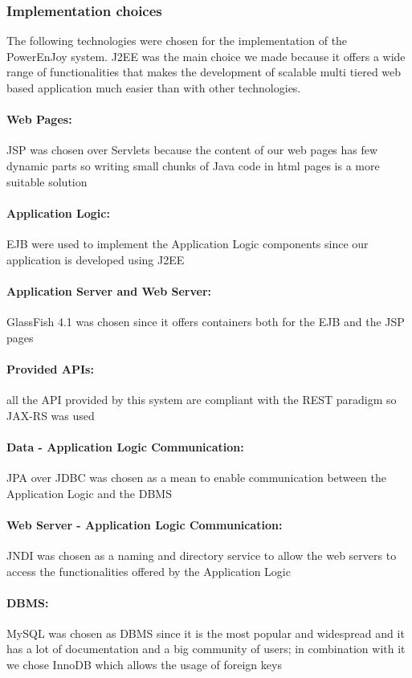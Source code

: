 \subsubsection{Implementation choices}
The following technologies were chosen for the implementation of the PowerEnJoy system. J2EE was the main choice we made because it offers a wide range of functionalities that makes the development of scalable multi tiered web based application much easier than with other technologies.

\paragraph{Web Pages:} JSP was chosen over Servlets because the content of our web pages has few dynamic parts so writing small chunks of Java code in html pages is a more suitable solution
\paragraph{Application Logic:} EJB were used to implement the Application Logic components since our application is developed using J2EE
\paragraph{Application Server and Web Server:} GlassFish 4.1 was chosen since it offers containers both for the EJB and the JSP pages 
\paragraph{Provided APIs:} all the API provided by this system are compliant with the REST paradigm so JAX-RS was used
\paragraph{Data - Application Logic Communication:} JPA over JDBC was chosen as a mean to enable communication between the Application Logic and the DBMS
\paragraph{Web Server - Application Logic Communication:} JNDI was chosen as a naming and directory service to allow the web servers to access the functionalities offered by the Application Logic
\paragraph{DBMS:} MySQL was chosen as DBMS since it is the most popular and widespread and it has a lot of documentation and a big community of users; in combination with it we chose InnoDB which allows the usage of foreign keys
\clearpage
